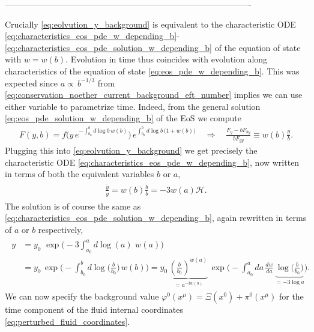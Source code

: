 {\color{gray}
----------------------------------------------------------------------------------------

Crucially \eqref{eq:eolvution_y_background} is equivalent to the characteristic ODE \eqref{eq:characteristics_eos_pde_w_depending_b}-\eqref{eq:characteristics_eos_pde_solution_w_depending_b} of the equation of state with $w=w(b)$.
Evolution in time thus coincides with evolution along characteristics of the equation of state \eqref{eq:eos_pde_w_depending_b}.
This was expected since $a\propto\, b^{-1/3}$ from \eqref{eq:conservation_noether_current_background_eft_number} implies we can use either variable to parametrize time.
Indeed, from the general solution \eqref{eq:eos_pde_solution_w_depending_b} of the EoS we compute
\begin{align}
    F(y,b)=f\Big(y\, e^{-\int_{b_0}^bd\log b\, w(b)}\Big)\, e^{\int_{b_0}^bd\log b\, \big(1+w(b)\big)} \quad \Rightarrow\quad  \frac{F_y-bF_{by}}{bF_{yy}} \equiv w(b)\frac{y}{b}.
\end{align}
Plugging this into \eqref{eq:eolvution_y_background} we get precisely the characteristic ODE \eqref{eq:characteristics_eos_pde_w_depending_b}, now written in terms of both the equivalent variables $b$ or $a$,
{\small\begin{align}\label{eq:evolution_y_background_equation_final}
\begin{aligned}
    \frac{\dot{y}}{y}=w(b)\frac{\dot{b}}{b}=-3w(a)\mathcal{H}.
\end{aligned}
\end{align}}
The solution is of course the same as \eqref{eq:characteristics_eos_pde_solution_w_depending_b}, again rewritten in terms of $a$ or $b$ respectively,
{\small\begin{align}\label{eq:evolution_y_background_solution}
\begin{aligned}
    y
    &=y_0\,\,\exp\Big(\!\!-\!\!3\!\!\int^a_{a_0}\!\!\!\!\!d\!\log(a)\,\, w(a)\Big)\\[2.5pt]
    &=y_0\,\exp\Big(\!\!-\!\!\!\int_{b_0}^b\!\!\!\!\!d\!\log\big(\tfrac{b}{b_0}\big)\,w(b)\Big)
    =y_0\,\underbrace{\left(\tfrac{b}{b_0}\right)^{w(a)}}_{=a^{-3w(a)}}\,\exp\Big(\!\!-\!\!\!\int_{a_0}^a\!\!\!\!\!da\, \tfrac{dw}{da}\, \underbrace{\log\big(\tfrac{b}{b_0}\big)}_{=-3\log a}\Big).
\end{aligned}
\end{align}}
We can now specify the background value $\varphi^0(x^\mu)=\Xi(x^0)+\pi^0(x^\mu)$ for the time component of the fluid internal coordinates \eqref{eq:perturbed_fluid_coordinates}.
}
